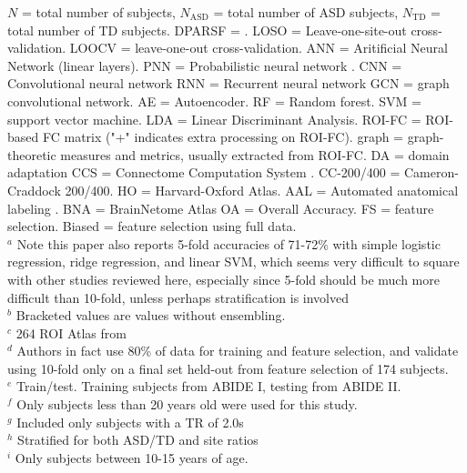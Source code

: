 \documentclass[10pt]{article}
\begin{document}
\begin{landscape}
\begin{table}
{    \(N\) = total number of subjects,
    \(N_{\text{ASD}}\) = total number of ASD subjects,
    \(N_{\text{TD}}\) = total number of TD subjects.
    DPARSF = \citep[see][]{yanDPARSFMATLABToolbox2010}.
    LOSO = Leave-one-site-out cross-validation.
    LOOCV = leave-one-out cross-validation.
    ANN = Aritificial Neural Network (linear layers).
    PNN = Probabilistic neural network \citep{spechtProbabilisticNeuralNetworks1990}.
    CNN = Convolutional neural network
    RNN = Recurrent neural network
    GCN = graph convolutional network.
    AE = Autoencoder. RF = Random forest. SVM = support vector machine.
    LDA = Linear Discriminant Analysis.
    ROI-FC = ROI-based FC matrix ("+" indicates extra processing on ROI-FC).
    graph = graph-theoretic measures and metrics, usually extracted from ROI-FC.
    DA = domain adaptation
    CCS = Connectome Computation System \citep{xuConnectomeComputationSystem2015}.
    CC-200/400 = Cameron-Craddock 200/400.
    HO = Harvard-Oxford Atlas.
    AAL = Automated anatomical labeling \citep{tzourio-mazoyerAutomatedAnatomicalLabeling2002}.
    BNA = BrainNetome Atlas \citep{fanHumanBrainnetomeAtlas2016}
    OA = Overall Accuracy.
    FS = feature selection.
    Biased = feature selection using full data.
    \\\hspace{\textheight} \(^a\) Note this paper also reports 5-fold accuracies of 71-72\% with simple
    logistic regression, ridge regression, and linear SVM, which seems very difficult to square with
    other studies reviewed here, especially since 5-fold should be much more difficult than 10-fold,
    unless perhaps stratification is involved
    \\\hspace{\textheight} \(^b\) Bracketed values are values without ensembling.
    \\\hspace{\textheight} \(^c\) 264 ROI Atlas from \citep{powerFunctionalNetworkOrganization2011}
    \\\hspace{\textheight} \(^d\) Authors in fact use 80\% of data for training and feature selection,
    and validate using 10-fold only on a final set held-out from feature selection of 174 subjects.
    \\\hspace{\textheight} \(^e\) Train/test. Training subjects from ABIDE I, testing from ABIDE II.
    \\\hspace{\textheight} \(^f\) Only subjects less than 20 years old were used for this study.
    \\\hspace{\textheight} \(^g\) Included only subjects with a TR of 2.0s
    \\\hspace{\textheight} \(^h\) Stratified for both ASD/TD and site ratios
    \\\hspace{\textheight} \(^i\) Only subjects between 10-15 years of age.
  }
  \normalsize
\end{table}
\end{landscape}
\end{document}
